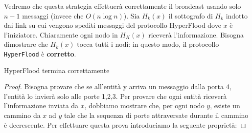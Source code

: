 Vedremo che questa strategia effettuerà correttamente il broadcast usando solo
$n-1$ messaggi (invece che $O(n \log n)$). Sia $H_k(x)$ il sottografo di $H_k$
indotto dai link su cui vengono spediti messaggi del protocollo HyperFlood dove
$x$ è l'iniziatore. Chiaramente ogni nodo in $H_K(x)$ riceverà l'informazione.
Bisogna dimostrare che $H_k(x)$ tocca tutti i nodi: in questo modo, il
protocollo \texttt{HyperFlood} è \textbf{corretto}.

\begin{prop}
    HyperFlood termina correttamente
\end{prop}
\begin{proof}
    Bisogna provare che se all'entità y arriva un messaggio dalla porta 4,
    l'entità lo invierà solo alle porte 1,2,3. Per provare che ogni entità
    riceverà l'informazione inviata da $x$, dobbiamo mostrare che, per ogni nodo
    $y$, esiste un cammino da $x$ ad $y$ tale che la sequenza di porte
    attraversate durante il cammino è decrescente. Per effettuare questa prova
    introduciamo la seguente proprietà:
\end{proof}

